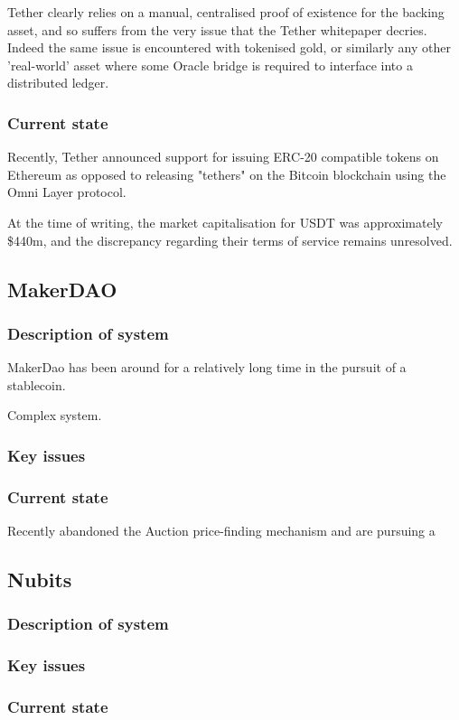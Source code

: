 \documentclass{article}
\begin{document}
Tether clearly relies on a manual, centralised proof of existence for the backing asset, and so suffers from the very issue that the Tether whitepaper decries. Indeed the same issue is encountered with tokenised gold, or similarly any other 'real-world' asset where some Oracle bridge is required to interface into a distributed ledger.

\subsubsection{Current state}

Recently, Tether announced support for issuing ERC-20 compatible tokens on Ethereum as opposed to releasing "tethers" on the Bitcoin blockchain using the Omni Layer protocol.

At the time of writing, the market capitalisation for USDT was approximately \$440m, and the discrepancy regarding their terms of service remains unresolved.


\subsection{MakerDAO}

\subsubsection{Description of system}

MakerDao has been around for a relatively long time in the pursuit of a stablecoin.

Complex system.

\subsubsection{Key issues}

\subsubsection{Current state}

Recently abandoned the Auction price-finding mechanism and are pursuing a 


\subsection{Nubits}

\subsubsection{Description of system}

\subsubsection{Key issues}

\subsubsection{Current state}



\pagebreak


\end{document}
